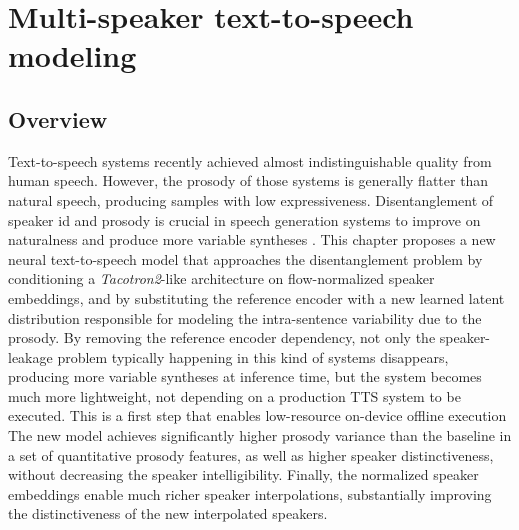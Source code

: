 \chapter{Multi-speaker text-to-speech modeling} \label{ch:tts}
\section{Overview}
Text-to-speech systems recently achieved almost indistinguishable quality from human speech. However, the prosody of those systems is generally flatter than natural speech, producing samples with low expressiveness. Disentanglement of speaker id and prosody is crucial in speech generation systems to improve on naturalness and produce more variable syntheses \autocite{markovi2015}. This chapter proposes a new neural text-to-speech model that approaches the disentanglement problem by conditioning a \textit{Tacotron2}-like architecture on flow-normalized speaker embeddings, and by substituting the reference encoder with a new learned latent distribution responsible for modeling the intra-sentence variability due to the prosody. By removing the reference encoder dependency, not only the speaker-leakage problem typically happening in this kind of systems disappears, producing more variable syntheses at inference time, but the system becomes much more lightweight, not depending on a production TTS system to be executed. This is a first step that enables low-resource on-device offline execution The new model achieves significantly higher prosody variance than the baseline in a set of quantitative prosody features, as well as higher speaker distinctiveness, without decreasing the speaker intelligibility. Finally, the normalized speaker embeddings enable much richer speaker interpolations, substantially improving the distinctiveness of the new interpolated speakers.


